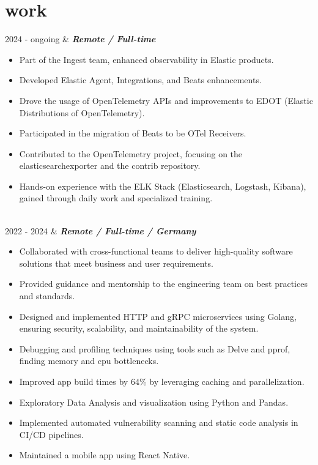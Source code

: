 \documentclass[]{cv-mauri}
\begin{document}
\section*{work}
\begin{tabularcv}
	2024 - ongoing   &   
				\textbf{\textit{Remote / Full-time}}

		\begin{itemize}
			\item Part of the Ingest team, enhanced observability in Elastic products.
			\item Developed Elastic Agent, Integrations, and Beats enhancements.
			\item Drove the usage of OpenTelemetry APIs and improvements to EDOT (Elastic Distributions of OpenTelemetry).
			\item Participated in the migration of Beats to be OTel Receivers.
			\item Contributed to the OpenTelemetry project, focusing on the elasticsearchexporter and the contrib repository.
			\item Hands-on experience with the ELK Stack (Elasticsearch, Logstash, Kibana), gained through daily work and specialized training.
		\end{itemize}
				\\[\vspacepar]
	2022 - 2024   &   
					\textbf{\textit{Remote / Full-time / Germany}}

			\begin{itemize}
				\item Collaborated with cross-functional teams to deliver high-quality software solutions that meet business and user requirements.
				\item Provided guidance and mentorship to the engineering team on best practices and standards.
				\item Designed and implemented HTTP and gRPC microservices using Golang, ensuring security, scalability, and maintainability of the system.
				\item Debugging and profiling techniques using tools such as Delve and pprof, finding memory and cpu bottlenecks.
				\item Improved app build times by 64\% by leveraging caching and parallelization.
				\item Exploratory Data Analysis and visualization using Python and Pandas.
				\item Implemented automated vulnerability scanning and static code analysis in CI/CD pipelines.
				\item Maintained a mobile app using React Native.
			\end{itemize}
					\\[\vspacepar]


\end{tabularcv}
\end{document}
